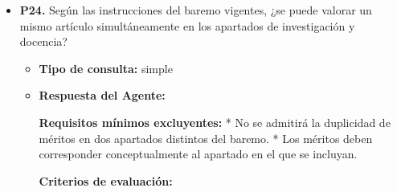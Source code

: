 \documentclass{article}
\begin{document}
\begin{itemize}
\begin{itemize}
                        Considerando que se pueden presentar un máximo de 5 patentes, los puntos máximos que se pueden conseguir mediante patentes en explotación serían:

                        * 5 patentes de invención internacionales con PCT y en explotación: 5 x 16,0 puntos = 80,0 puntos (superior al límite de 20 puntos para este apartado)
                        * Combinación de patentes de invención, modelos de utilidad y diseños industriales en explotación: el máximo teórico sería 20 puntos, considerando la combinación de patentes que maximice la puntuación.

                        En resumen, el máximo de puntos que se pueden conseguir mediante patentes en explotación es de \textbf{20 puntos}, siempre que se cumplan los requisitos y se maximice la puntuación con la combinación de patentes adecuada.
                  \item \textbf{Contexto utilizado:}

            \end{itemize}

      \item \textbf{P24.} Según las instrucciones del baremo vigentes, ¿se puede valorar un mismo artículo simultáneamente en los apartados de investigación y docencia? \\
            \begin{itemize}
                  \item \textbf{Tipo de consulta:} simple
                  \item \textbf{Respuesta del Agente:}

                        \textbf{Requisitos mínimos excluyentes:}
                        * No se admitirá la duplicidad de méritos en dos apartados distintos del baremo.
                        * Los méritos deben corresponder conceptualmente al apartado en el que se incluyan.

                        \textbf{Criterios de evaluación:}


\end{itemize}
\end{itemize}
\end{document}
